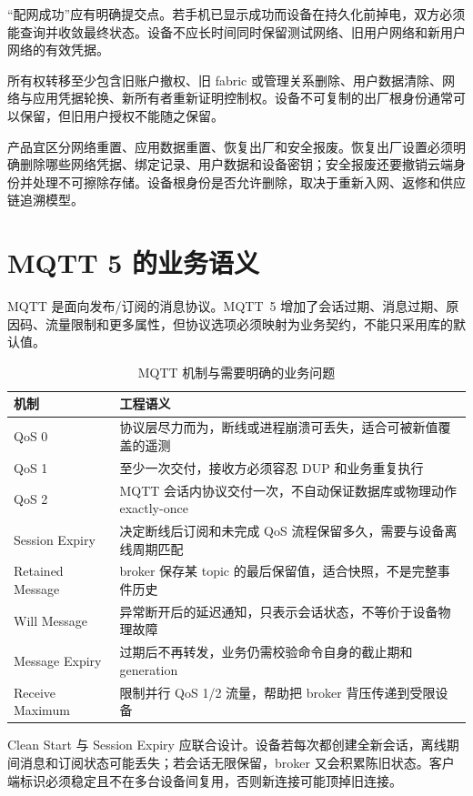 “配网成功”应有明确提交点。若手机已显示成功而设备在持久化前掉电，双方必须能查询并收敛最终状态。设备不应长时间同时保留测试网络、旧用户网络和新用户网络的有效凭据。

所有权转移至少包含旧账户撤权、旧 fabric 或管理关系删除、用户数据清除、网络与应用凭据轮换、新所有者重新证明控制权。设备不可复制的出厂根身份通常可以保留，但旧用户授权不能随之保留。

产品宜区分网络重置、应用数据重置、恢复出厂和安全报废。恢复出厂设置必须明确删除哪些网络凭据、绑定记录、用户数据和设备密钥；安全报废还要撤销云端身份并处理不可擦除存储。设备根身份是否允许删除，取决于重新入网、返修和供应链追溯模型。

\section{MQTT 5 的业务语义}

MQTT 是面向发布/订阅的消息协议。MQTT~5 增加了会话过期、消息过期、原因码、流量限制和更多属性，但协议选项必须映射为业务契约，不能只采用库的默认值\cite{mqtt-v5}。

\begin{table}[htbp]
  \centering
  \caption{MQTT 机制与需要明确的业务问题}
  \small
  \begin{tabular}{p{30mm}p{100mm}}
    \hline
    机制 & 工程语义 \\
    \hline
    QoS 0 & 协议层尽力而为，断线或进程崩溃可丢失，适合可被新值覆盖的遥测 \\
    QoS 1 & 至少一次交付，接收方必须容忍 DUP 和业务重复执行 \\
    QoS 2 & MQTT 会话内协议交付一次，不自动保证数据库或物理动作 \mbox{exactly-once} \\
    Session Expiry & 决定断线后订阅和未完成 QoS 流程保留多久，需要与设备离线周期匹配 \\
    Retained Message & broker 保存某 topic 的最后保留值，适合快照，不是完整事件历史 \\
    Will Message & 异常断开后的延迟通知，只表示会话状态，不等价于设备物理故障 \\
    Message Expiry & 过期后不再转发，业务仍需校验命令自身的截止期和 generation \\
    Receive Maximum & 限制并行 QoS 1/2 流量，帮助把 broker 背压传递到受限设备 \\
    \hline
  \end{tabular}
\end{table}

Clean Start 与 Session Expiry 应联合设计。设备若每次都创建全新会话，离线期间消息和订阅状态可能丢失；若会话无限保留，broker 又会积累陈旧状态。客户端标识必须稳定且不在多台设备间复用，否则新连接可能顶掉旧连接。

